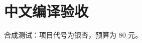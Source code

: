 \documentclass[UTF8,fontset=claurst]{ctexart}
\begin{document}
\section{中文编译验收}
合成测试：项目代号为银杏，预算为 80 元。
\end{document}
